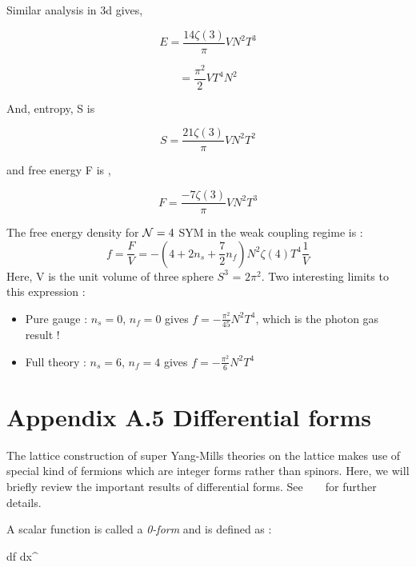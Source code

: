Similar analysis in 3d gives, 

\begin{equation}
E =  \frac{14\zeta(3)}{\pi}VN^2T^3 
\end{equation} 

\[  =  \frac{\pi^2}{2}VT^4 N^2  \] 

And, entropy, S is 

\begin{equation}
S = \frac{21\zeta(3)}{\pi}VN^2T^2
\end{equation} 

and free energy F is , 

\begin{equation}
F = \frac{-7\zeta(3)}{\pi}VN^2T^3
\end{equation} 

The free energy density for ${\cal N}=4$  SYM in the weak coupling regime is :
\begin{equation}
    f = \frac{F}{V} = - \left(4 + 2n_{s} + \frac{7}{2} n_{f}\right) N^{2} \zeta(4) T^{4} \frac{1}{V} 
\end{equation}
Here, V is the unit volume of three sphere $S^{3}$ = $2\pi^2$. 
Two interesting limits to this expression :

\begin{itemize}
\item Pure gauge : $n_{s} = 0$, $n_{f} = 0$ gives $f = - \frac{\pi^2}{45} N^{2}T^{4}$, which is the photon gas result ! 
\item Full theory : $n_{s} = 6$, $n_{f} = 4$ gives $f = - \frac{\pi^2}{6} N^{2}T^{4}$
\end{itemize}



\section*{\label{app:dforms} Appendix A.5 Differential forms}

The lattice construction of super Yang-Mills theories on the lattice makes use of special kind of fermions which are 
integer forms rather than spinors. Here, we will briefly review the important results of differential forms. 
See ~\cite{Zumino:1983rz} ~\cite{MTW} for further details. 

A scalar function is called a \emph{0-form} and is defined as : 

\beq
df \equiv {} dx^{\mu} 
\eeq 



